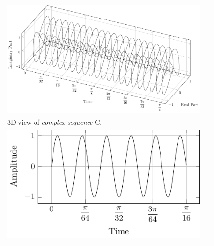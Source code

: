 \documentclass[../../course]{subfiles}
\begin{document}
\begin{figure} [H]

    \renewcommand{\arraystretch}{0.7}
    \centering
    \begin{NiceTabularX} {\textwidth} {
            *{2}{>{\centering\arraybackslash}X}
        }

         {
             {
                \includegraphics[height = \textheight] {tikzpics/plotComplexC.pdf}
            }
        }

        &
        \\

         {
            \vbox{
                 {3D view of \emph{complex sequence} C.}
                \label{plt:cmplxC}
            }
        }

        &
        \\

         {
             {
                \includegraphics[height = \textheight] {tikzpics/plotShortX1.pdf}
            }
        }

        &


\end{NiceTabularX}
\end{figure}
\end{document}
